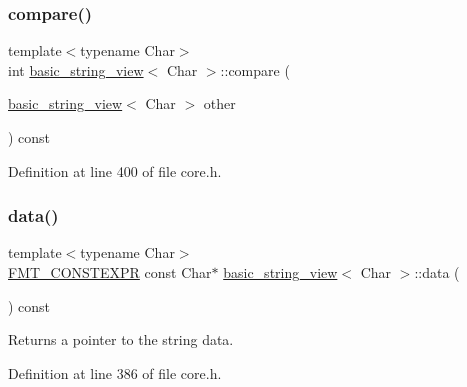 \subsubsection{\texorpdfstring{compare()}{compare()}}
{\footnotesize\ttfamily template$<$typename Char$>$ \\
int \hyperlink{classbasic__string__view}{basic\+\_\+string\+\_\+view}$<$ Char $>$\+::compare (\begin{DoxyParamCaption}\item[{\hyperlink{classbasic__string__view}{basic\+\_\+string\+\_\+view}$<$ Char $>$}]{other }\end{DoxyParamCaption}) const\hspace{0.3cm}{\ttfamily [inline]}}



Definition at line 400 of file core.\+h.

\mbox{\label{classbasic__string__view_a48c221f626c53e68f6d63105329f6b08}} 
\subsubsection{\texorpdfstring{data()}{data()}}
{\footnotesize\ttfamily template$<$typename Char$>$ \\
\hyperlink{core_8h_a69201cb276383873487bf68b4ef8b4cd}{F\+M\+T\+\_\+\+C\+O\+N\+S\+T\+E\+X\+PR} const Char$\ast$ \hyperlink{classbasic__string__view}{basic\+\_\+string\+\_\+view}$<$ Char $>$\+::data (\begin{DoxyParamCaption}{ }\end{DoxyParamCaption}) const\hspace{0.3cm}{\ttfamily [inline]}}

Returns a pointer to the string data. 

Definition at line 386 of file core.\+h.

